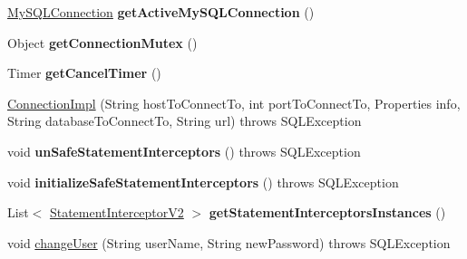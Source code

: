\begin{DoxyCompactItemize}
\item 
\mbox{\label{classcom_1_1mysql_1_1jdbc_1_1_connection_impl_a0ec8eb275d7aa6b8951d3212642f4c79}} 
\mbox{\hyperlink{interfacecom_1_1mysql_1_1jdbc_1_1_my_s_q_l_connection}{My\+S\+Q\+L\+Connection}} {\bfseries get\+Active\+My\+S\+Q\+L\+Connection} ()
\item 
\mbox{\label{classcom_1_1mysql_1_1jdbc_1_1_connection_impl_a4fe3779a39c85216919c4a327c91cc79}} 
Object {\bfseries get\+Connection\+Mutex} ()
\item 
\mbox{\label{classcom_1_1mysql_1_1jdbc_1_1_connection_impl_a4fbb69d6c415e0cf0a3413ec0566b8bb}} 
Timer {\bfseries get\+Cancel\+Timer} ()
\item 
\mbox{\hyperlink{classcom_1_1mysql_1_1jdbc_1_1_connection_impl_afe73579e653474ca1773a609fe7863a1}{Connection\+Impl}} (String host\+To\+Connect\+To, int port\+To\+Connect\+To, Properties info, String database\+To\+Connect\+To, String url)  throws S\+Q\+L\+Exception 
\item 
\mbox{\label{classcom_1_1mysql_1_1jdbc_1_1_connection_impl_a58101d757d4b4806a1ce6b5ebdc13eaf}} 
void {\bfseries un\+Safe\+Statement\+Interceptors} ()  throws S\+Q\+L\+Exception 
\item 
\mbox{\label{classcom_1_1mysql_1_1jdbc_1_1_connection_impl_a1e03f5f2f2842d499e06d45634e72c70}} 
void {\bfseries initialize\+Safe\+Statement\+Interceptors} ()  throws S\+Q\+L\+Exception 
\item 
\mbox{\label{classcom_1_1mysql_1_1jdbc_1_1_connection_impl_a4ca73f4f89dfbae7884bc4537b046bd9}} 
List$<$ \mbox{\hyperlink{interfacecom_1_1mysql_1_1jdbc_1_1_statement_interceptor_v2}{Statement\+Interceptor\+V2}} $>$ {\bfseries get\+Statement\+Interceptors\+Instances} ()
\item 
void \mbox{\hyperlink{classcom_1_1mysql_1_1jdbc_1_1_connection_impl_a60c2e281bd048fd455dcd75f2c968c27}{change\+User}} (String user\+Name, String new\+Password)  throws S\+Q\+L\+Exception 
\item 
\mbox{\label{classcom_1_1mysql_1_1jdbc_1_1_connection_impl_a3cae3731cdedf385d4a4ea697cfb9cf7}} 

\end{DoxyCompactItemize}
